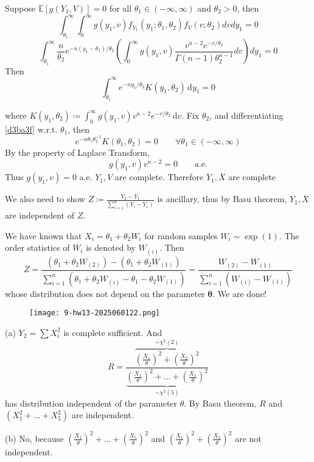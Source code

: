 Suppose $\mathbb{E}[g(Y_1,V)]=0$ for all $\theta_1\in(-\infty,\infty )$ and $\theta_2>0$, then
\[
\int_{\theta_1}^\infty\int_0^\infty g(y_1,v)f_{Y_1}(y_1;\theta_1,\theta_2)f_V(v;\theta_2)dvdy_1=0
\]
\[
\int_{\theta_1}^\infty\frac{n}{\theta_2}e^{-n (y_1-\theta_1)/\theta_2}\left (\int_0^\infty g (y_1, v)\frac{v^{n-2}e^{-v/\theta_2}}{\Gamma (n-1)\theta_2^{n-1}}dv\right) dy_1=0
\]
Then
\begin{equation}
\int_{\theta_1}^{\infty} e^{ -ny_1/\theta_2 }K(y_1,\theta_2) \, \mathrm{d}y_1=0
\label{d3ba3f}
\end{equation}

where $K(y_1,\theta_2)\coloneqq \int_{0}^{\infty} g(y_1,v)v^{n-2}e^{ -v/\theta_2 } \, \mathrm{d}v$. Fix $\theta_2$, and differentiating \cref{d3ba3f} w.r.t. $\theta_1$, then
\[
e^{ -n\theta_1\theta_2 ^{-1} }K(\theta_1,\theta_2)=0\qquad \forall \theta_1\in(-\infty,\infty)
\]
By the property of Laplace Transform,
\[
g(y_1,v)v^{n-2}=0\qquad \text{a.e.}
\]
Thus $g(y_1,v)=0$ a.e. $Y_1,V$ are complete. Therefore $Y_1,\overline{X}$ are complete

We also need to show $Z\coloneqq\frac{Y_2-Y_1}{\sum_{i=1}^{n}(Y_i-Y_1)}$ is ancillary, thus by Basu theorem, $Y_1,\overline{X}$ are independent of $Z$.

We have known that $X_i=\theta_1+\theta_2W_i$ for random samples $W_i\sim \exp(1)$. The order statistics of $W_i$ is denoted by $W_{(i)}$. Then
\[
Z=\frac{(\theta_1+\theta_2W_{(2)})-(\theta_1+\theta_2W_{(1)})}{\sum_{i=1}^{n} (\theta_1+\theta_2 W_{(i)}-\theta_1-\theta_2 W_{(1)})}=\frac{W_{(2)}-W_{(1)}}{\sum_{i=1}^{n} (W_{(i)}-W_{(1)})}
\]
whose distribution does not depend on the parameter $\boldsymbol{\theta}$. We are done!

\begin{exercise}
\begin{figure}[H]
\centering
\texttt{[image: 9-hw13-2025060122.png]}
\label{}
\end{figure}
\end{exercise}
(a) $Y_2=\sum X_i^2$ is complete sufficient. And
\[
R=\frac{\overbrace{ \left( \frac{X_1}{\theta} \right)^2+\left( \frac{X_2}{\theta} \right)^2 }^{ \sim \chi^{2}(2) }}{\underbrace{ \left( \frac{X_1}{\theta} \right)^2+\dots+\left( \frac{X_5}{\theta} \right)^2 }_{ \sim \chi^{2}(5) }}
\]
has distribution independent of the parameter $\theta$. By Basu theorem, $R$ and $(X_1^2+\dots+X_5^2)$ are independent.

(b)
No, because $\left( \frac{X_1}{\theta} \right)^2+\dots+\left( \frac{X_5}{\theta} \right)^2$ and $\left(\frac{X_1}{\theta} \right)^2+\left ( \frac{X_2}{\theta} \right)^2$ are not independent.

